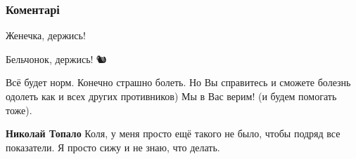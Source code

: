  
 
 
 
 
\subsubsection{Коментарі}

\begin{itemize}
 
Женечка, держись!

 
Бельчонок, держись! 🐿️

 
Всё будет норм. Конечно страшно болеть. Но Вы справитесь и сможете болезнь
одолеть как и всех других противников) Мы в Вас верим! (и будем помогать тоже).

\begin{itemize}
 
\textbf{Николай Топало} Коля, у меня просто ещё такого не было, чтобы подряд все показатели. Я просто сижу и не знаю, что делать.

 


\end{itemize}
\end{itemize}
